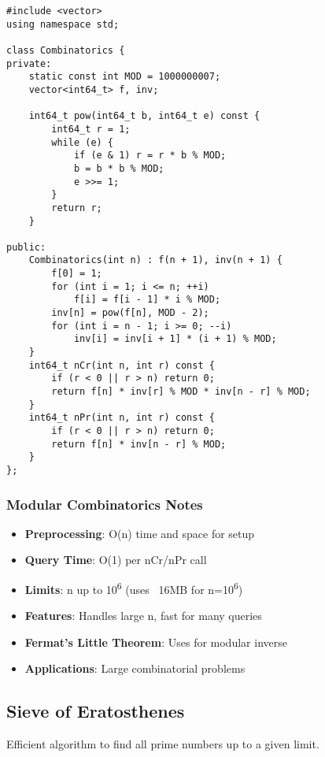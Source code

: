 \documentclass[11pt,a4paper]{article}
\begin{document}
\newpage
\begin{lstlisting}[caption={Combinatorics with Modular Arithmetic}]
#include <vector>
using namespace std;

class Combinatorics {
private:
    static const int MOD = 1000000007;
    vector<int64_t> f, inv;
    
    int64_t pow(int64_t b, int64_t e) const {
        int64_t r = 1;
        while (e) {
            if (e & 1) r = r * b % MOD;
            b = b * b % MOD;
            e >>= 1;
        }
        return r;
    }

public:
    Combinatorics(int n) : f(n + 1), inv(n + 1) {
        f[0] = 1;
        for (int i = 1; i <= n; ++i)
            f[i] = f[i - 1] * i % MOD;
        inv[n] = pow(f[n], MOD - 2);
        for (int i = n - 1; i >= 0; --i)
            inv[i] = inv[i + 1] * (i + 1) % MOD;
    }
    int64_t nCr(int n, int r) const {
        if (r < 0 || r > n) return 0;
        return f[n] * inv[r] % MOD * inv[n - r] % MOD;
    }
    int64_t nPr(int n, int r) const {
        if (r < 0 || r > n) return 0;
        return f[n] * inv[n - r] % MOD;
    }
};
\end{lstlisting}

\subsubsection*{Modular Combinatorics Notes}
\begin{itemize}
\item \textbf{Preprocessing}: O(n) time and space for setup
\item \textbf{Query Time}: O(1) per nCr/nPr call
\item \textbf{Limits}: n up to 10\textsuperscript{6} (uses ~16MB for n=10\textsuperscript{6})
\item \textbf{Features}: Handles large n, fast for many queries
\item \textbf{Fermat's Little Theorem}: Uses for modular inverse
\item \textbf{Applications}: Large combinatorial problems
\end{itemize}

\newpage
\subsection{Sieve of Eratosthenes}
Efficient algorithm to find all prime numbers up to a given limit.
\end{document}
